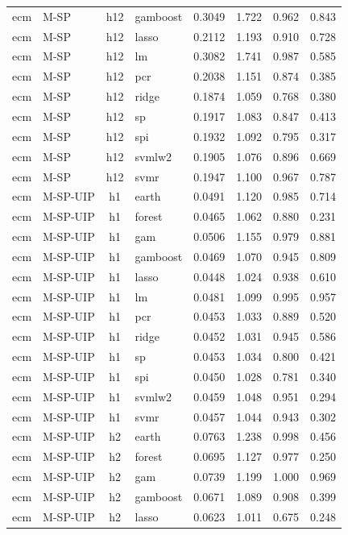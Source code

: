 \begin{ThreePartTable}
\begin{longtable}[t]{llclcccc}
ecm & M-SP & h12 & gamboost & 0.3049 & 1.722 & 0.962 & 0.843\\
ecm & M-SP & h12 & lasso & 0.2112 & 1.193 & 0.910 & 0.728\\
ecm & M-SP & h12 & lm & 0.3082 & 1.741 & 0.987 & 0.585\\
ecm & M-SP & h12 & pcr & 0.2038 & 1.151 & 0.874 & 0.385\\
ecm & M-SP & h12 & ridge & 0.1874 & 1.059 & 0.768 & 0.380\\
ecm & M-SP & h12 & sp & 0.1917 & 1.083 & 0.847 & 0.413\\
ecm & M-SP & h12 & spi & 0.1932 & 1.092 & 0.795 & 0.317\\
ecm & M-SP & h12 & svmlw2 & 0.1905 & 1.076 & 0.896 & 0.669\\
ecm & M-SP & h12 & svmr & 0.1947 & 1.100 & 0.967 & 0.787\\
\addlinespace
ecm & M-SP-UIP & h1 & earth & 0.0491 & 1.120 & 0.985 & 0.714\\
ecm & M-SP-UIP & h1 & forest & 0.0465 & 1.062 & 0.880 & 0.231\\
ecm & M-SP-UIP & h1 & gam & 0.0506 & 1.155 & 0.979 & 0.881\\
ecm & M-SP-UIP & h1 & gamboost & 0.0469 & 1.070 & 0.945 & 0.809\\
ecm & M-SP-UIP & h1 & lasso & 0.0448 & 1.024 & 0.938 & 0.610\\
ecm & M-SP-UIP & h1 & lm & 0.0481 & 1.099 & 0.995 & 0.957\\
ecm & M-SP-UIP & h1 & pcr & 0.0453 & 1.033 & 0.889 & 0.520\\
ecm & M-SP-UIP & h1 & ridge & 0.0452 & 1.031 & 0.945 & 0.586\\
ecm & M-SP-UIP & h1 & sp & 0.0453 & 1.034 & 0.800 & 0.421\\
ecm & M-SP-UIP & h1 & spi & 0.0450 & 1.028 & 0.781 & 0.340\\
ecm & M-SP-UIP & h1 & svmlw2 & 0.0459 & 1.048 & 0.951 & 0.294\\
ecm & M-SP-UIP & h1 & svmr & 0.0457 & 1.044 & 0.943 & 0.302\\
\addlinespace
ecm & M-SP-UIP & h2 & earth & 0.0763 & 1.238 & 0.998 & 0.456\\
ecm & M-SP-UIP & h2 & forest & 0.0695 & 1.127 & 0.977 & 0.250\\
ecm & M-SP-UIP & h2 & gam & 0.0739 & 1.199 & 1.000 & 0.969\\
ecm & M-SP-UIP & h2 & gamboost & 0.0671 & 1.089 & 0.908 & 0.399\\
ecm & M-SP-UIP & h2 & lasso & 0.0623 & 1.011 & 0.675 & 0.248\\

\end{longtable}
\end{ThreePartTable}
